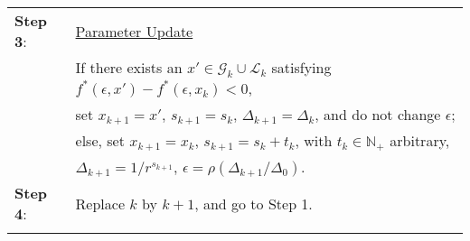 \begin{minipage}[b]{\textwidth}
\begin{algorithm}
{\begin{tabular}{ll}
  \textbf{Step 3}:
     & \underline{Parameter Update}\\
     & If there exists an $x' \in \mathcal G_k \cup \mathcal L_k$
       satisfying
       $f^*(\epsilon, x') - f^*(\epsilon, x_k) < 0$,\\
     & set  $x_{k+1} = x'$, $s_{k+1}= s_k$, $\Delta_{k+1} = \Delta_k$,
       and do not change $\epsilon$;\\
     & else, set $x_{k+1} = x_k$, $s_{k+1} = s_k + t_k$, with $t_k \in
       \mathbb N_+$ arbitrary,\\
     & $\Delta_{k+1} = 1/r^{s_{k+1}}$, 
       $\epsilon = \rho(\Delta_{k+1} / \Delta_0)$.\\
  \textbf{Step 4}:
     & Replace $k$ by $k + 1$, and go to Step 1.\\
    \hline \\
\end{tabular}
}
~\\ \label{al:GPSImp}
\end{algorithm}
\end{minipage}
\newpage
